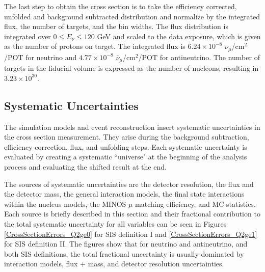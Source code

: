 \documentclass[aps, prd, twocolumn, showpacs, superscriptaddress, floatfix]{revtex4-2}
\begin{document}
The last step to obtain the cross section is to take the efficiency corrected, unfolded and background subtracted distribution and normalize by the integrated flux, the number of targets, and the bin widths. The flux distribution is integrated over $0 \leq E_{\nu} \leq 120$ GeV and scaled to the data exposure, which is given as the number of protons on target. The integrated flux is $6.24 \times 10^{-8}$ $\nu_{\mu}$/cm$^2$/POT for neutrino and $4.77 \times 10^{-8}$ $\bar{\nu}_{\mu}$/cm$^2$/POT for antineutrino. The number of targets in the fiducial volume is expressed as the number of nucleons, resulting in $3.23 \times 10^{30}$. 

\subsection{Systematic Uncertainties}
The simulation models and event reconstruction insert systematic uncertainties in the cross section measurement. They arise during the background subtraction, efficiency correction, flux, and unfolding steps. Each systematic uncertainty is evaluated by creating a systematic ``universe" at the beginning of the analysis process and evaluating the shifted result at the end. 

The sources of systematic uncertainties are the detector resolution, the flux and the detector mass, the general interaction models, the final state interactions within the nucleus models, the MINOS $\mu$ matching efficiency, and MC statistics. Each source is briefly described in this section and their fractional contribution to the total systematic uncertainty for all variables can be seen in Figures \ref{CrossSectionErrors_Q2ge0} for SIS definition I and \ref{CrossSectionErrors_Q2ge1} for SIS definition II. The figures show that for neutrino and antineutrino, and both SIS definitions, the total fractional uncertainty is usually dominated by interaction models, flux + mass, and detector resolution uncertainties.
\end{document}

